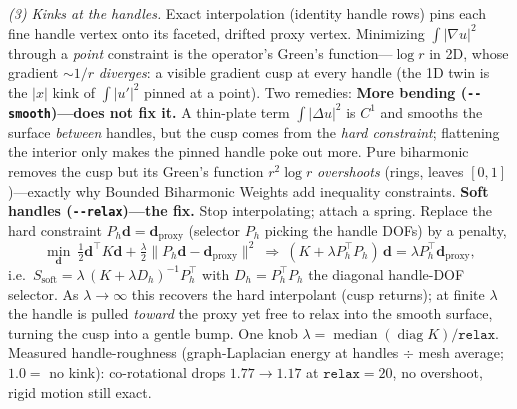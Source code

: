 \emph{(3) Kinks at the handles.}
Exact interpolation (identity handle rows) pins each fine handle vertex onto its faceted, drifted proxy vertex.
Minimizing $\int|\nabla u|^2$ through a \emph{point} constraint is the operator's Green's function---$\log r$ in 2D, whose gradient $\sim1/r$ \emph{diverges}: a visible gradient cusp at every handle (the 1D twin is the $|x|$ kink of $\int|u'|^2$ pinned at a point).
Two remedies:
\textbf{More bending (\texttt{-{}-smooth})---does not fix it.} A thin-plate term $\int|\Delta u|^2$ is $C^1$ and smooths the surface \emph{between} handles, but the cusp comes from the \emph{hard constraint}; flattening the interior only makes the pinned handle poke out more.
Pure biharmonic removes the cusp but its Green's function $r^2\log r$ \emph{overshoots} (rings, leaves $[0,1]$)---exactly why Bounded Biharmonic Weights add inequality constraints.
\textbf{Soft handles (\texttt{-{}-relax})---the fix.}
Stop interpolating; attach a spring.
Replace the hard constraint $P_h\mathbf d=\mathbf d_{\text{proxy}}$ (selector $P_h$ picking the handle DOFs) by a penalty,
\begin{equation}
\min_{\mathbf d}\ \tfrac12\mathbf d^\top K\mathbf d
  +\tfrac\lambda2\big\|P_h\mathbf d-\mathbf d_{\text{proxy}}\big\|^2
\ \Longrightarrow\ (K+\lambda P_h^\top P_h)\,\mathbf d=\lambda P_h^\top\mathbf d_{\text{proxy}},
\end{equation}
i.e.\ $S_{\text{soft}}=\lambda\,(K+\lambda D_h)^{-1}P_h^\top$ with $D_h=P_h^\top P_h$ the diagonal handle-DOF selector.
As $\lambda\to\infty$ this recovers the hard interpolant (cusp returns); at finite $\lambda$ the handle is pulled \emph{toward} the proxy yet free to relax into the smooth surface, turning the cusp into a gentle bump.
One knob $\lambda=\operatorname{median}(\operatorname{diag}K)/\texttt{relax}$.
Measured handle-roughness (graph-Laplacian energy at handles $\div$ mesh average; $1.0=$ no kink): co-rotational drops $1.77\to1.17$ at $\texttt{relax}=20$, no overshoot, rigid motion still exact.

